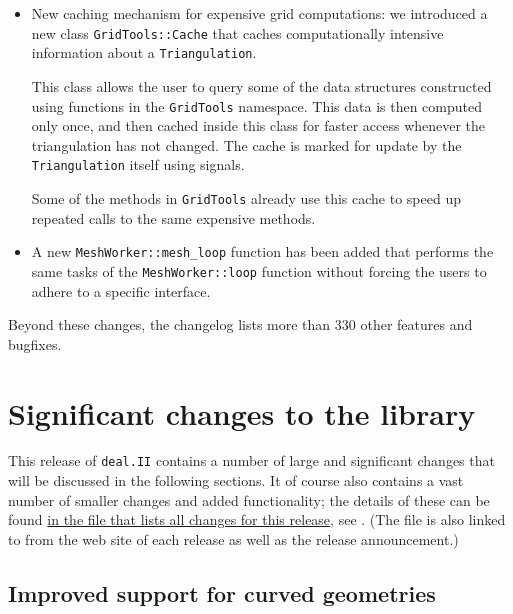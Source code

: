 \documentclass{ansarticle-preprint}
\newcommand{\specialword}[1]{\texttt{#1}}
\newcommand{\dealii}{{\specialword{deal.II}}\xspace}
\begin{document}
\begin{itemize}
\item New caching mechanism for expensive grid computations: we introduced a new
  class \texttt{GridTools::Cache} that caches computationally intensive
  information about a \texttt{Triangulation}.

This class allows the user to query some of the data structures constructed
using functions in the \texttt{GridTools} namespace. This data is then
computed only once, and
then cached inside this class for faster access whenever the triangulation has
not changed. The cache is marked for update by the \texttt{Triangulation} itself
using signals.

Some of the methods in \texttt{GridTools} already use this cache to
speed up repeated calls to the same expensive methods.
\item A new \texttt{MeshWorker::mesh\_loop} function has been added that
  performs the same tasks of the \texttt{MeshWorker::loop} function without
  forcing the users to adhere to a specific interface.

\end{itemize}
Beyond these changes, the changelog lists more than 330 other features and bugfixes.




\section{Significant changes to the library}

This release of \dealii contains a number of large and significant changes
that will be discussed in the following sections. It of course also contains a
vast number of smaller changes and added functionality; the details of these
can be found
\href{https://www.dealii.org/developer/doxygen/deal.II/changes_between_8_5_and_9_0.html}{
in the file that lists all changes for this release}, see \cite{changes90}.
(The file is also linked to from the web site of each release as well as
the release announcement.)

\subsection{Improved support for curved geometries}
\label{sec:manifolds}
\end{document}
